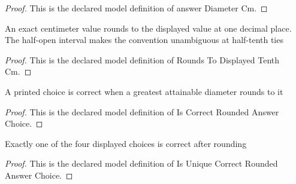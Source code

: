 \begin{proof}
  This is the declared model definition of answer Diameter Cm.
\end{proof}
\begin{definition}
  \label{def:physics:phyx-mini-0110:phyxminiproblems-problemphyxmini0110-roundstodisplayedtenthcm}
  An exact centimeter value rounds to the displayed value at one decimal place. The half-open interval makes the convention unambiguous at half-tenth ties
\end{definition}
\begin{proof}
  This is the declared model definition of Rounds To Displayed Tenth Cm.
\end{proof}
\begin{definition}
  \label{def:physics:phyx-mini-0110:phyxminiproblems-problemphyxmini0110-iscorrectroundedanswerchoice}
  A printed choice is correct when a greatest attainable diameter rounds to it
\end{definition}
\begin{proof}
  This is the declared model definition of Is Correct Rounded Answer Choice.
\end{proof}
\begin{definition}
  \label{def:physics:phyx-mini-0110:phyxminiproblems-problemphyxmini0110-isuniquecorrectroundedanswerchoice}
  Exactly one of the four displayed choices is correct after rounding
\end{definition}
\begin{proof}
  This is the declared model definition of Is Unique Correct Rounded Answer Choice.
\end{proof}
